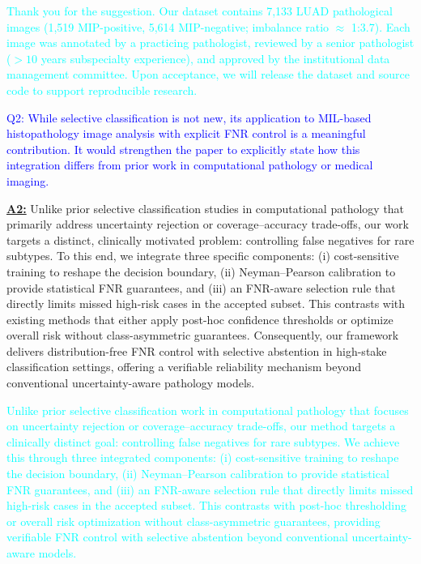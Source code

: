 \documentclass[UTF8,12pt]{article}
\begin{document}
\textcolor{cyan}{Thank you for the suggestion. Our dataset contains 7,133 LUAD pathological images (1,519 MIP-positive, 5,614 MIP-negative; imbalance ratio $\approx$ 1:3.7). Each image was annotated by a practicing pathologist, reviewed by a senior pathologist ($>10$ years subspecialty experience), and approved by the institutional data management committee. Upon acceptance, we will release the dataset and source code to support reproducible research.}

\textcolor{blue}{Q2: While selective classification is not new, its application to MIL-based histopathology image analysis with explicit FNR control is a meaningful contribution. It would strengthen the paper to explicitly state how this integration differs from prior work in computational pathology or medical imaging.}

\underline{{\bf A2:}} Unlike prior selective classification studies in computational pathology that primarily address uncertainty rejection or coverage–accuracy trade-offs, our work targets a distinct, clinically motivated problem: controlling false negatives for rare subtypes. To this end, we integrate three specific components: (i) cost-sensitive training to reshape the decision boundary, (ii) Neyman–Pearson calibration to provide statistical FNR guarantees, and (iii) an FNR-aware selection rule that directly limits missed high-risk cases in the accepted subset. This contrasts with existing methods that either apply post-hoc confidence thresholds or optimize overall risk without class-asymmetric guarantees. Consequently, our framework delivers distribution-free FNR control with selective abstention in high-stake classification settings, offering a verifiable reliability mechanism beyond conventional uncertainty-aware pathology models.

\textcolor{cyan}{Unlike prior selective classification work in computational pathology that focuses on uncertainty rejection or coverage–accuracy trade-offs, our method targets a clinically distinct goal: controlling false negatives for rare subtypes. We achieve this through three integrated components: (i) cost-sensitive training to reshape the decision boundary, (ii) Neyman–Pearson calibration to provide statistical FNR guarantees, and (iii) an FNR-aware selection rule that directly limits missed high-risk cases in the accepted subset. This contrasts with post-hoc thresholding or overall risk optimization without class-asymmetric guarantees, providing verifiable FNR control with selective abstention beyond conventional uncertainty-aware models.}
\end{document}
